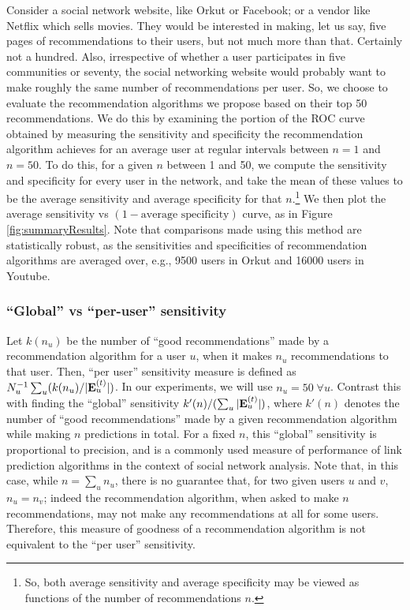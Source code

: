 Consider a social network website, like Orkut or Facebook; or a vendor like Netflix which sells movies. They would be interested in making, let us say, five pages of recommendations to their users, but not much more than that. Certainly not a hundred. Also, irrespective of whether a user participates in five communities or seventy, the social networking website would probably want to make roughly the same number of recommendations per user. So, we choose to evaluate the recommendation algorithms we propose based on their top 50 recommendations. 
We do this by examining the portion of the ROC curve obtained by measuring the sensitivity and specificity the recommendation algorithm achieves for an average user at regular intervals between $n = 1$ and $n = 50$. To do this, for a given $n$ between 1 and 50, we compute the sensitivity and specificity for every user in the network, and take the mean of these values to be the average sensitivity and average specificity for that $n$.\footnote{So, both average sensitivity and average specificity may be viewed as functions of the number of recommendations $n$.} We then plot the average sensitivity vs $(1 - \text{average specificity})$ curve, as in Figure \ref{fig:summaryResults}. Note that comparisons made using this method are statistically robust, as the sensitivities and specificities of recommendation algorithms are averaged over, e.g., 9500 users in Orkut and 16000 users in Youtube.

\subsubsection{``Global'' vs ``per-user'' sensitivity}
\label{sec:globalVsPerUserEvaluationMethods}
Let $k(n_u)$ be the number of ``good recommendations'' made by a recommendation algorithm for a user $u$, when it makes $n_u$ recommendations to that user. Then, ``per user'' sensitivity measure is defined as 
$N_u^{-1} \sum_u  ( k(n_u) / |\mathbf{E}_u^{(t)}|)$. 
In our experiments, we will use $n_u = 50\; \forall u$. Contrast this with finding the ``global'' sensitivity 
$k'(n) / ( \sum_u |\mathbf{E}_u^{(t)}|)$, 
where $k'(n)$ denotes the number of ``good recommendations'' made by a given recommendation algorithm while making $n$ predictions in total. For a fixed $n$, this ``global'' sensitivity is proportional to precision, and is a commonly used measure of performance of link prediction algorithms in the context of social network analysis. Note that, in this case, while $n = \sum_u n_u$, there is no guarantee that, for two given users $u$ and $v$, $n_u = n_v$; indeed the recommendation algorithm, when asked to make $n$ recommendations, may not make any recommendations at all for some users. Therefore, this measure of goodness of a recommendation algorithm is not equivalent to the ``per user'' sensitivity.

